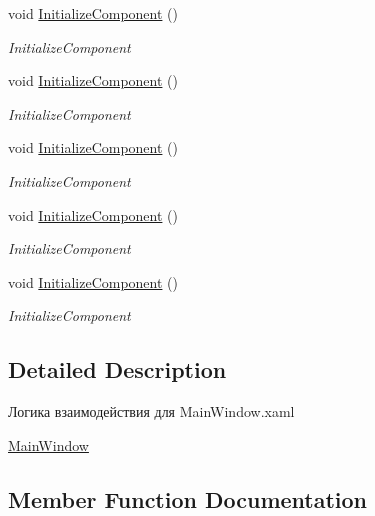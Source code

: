 \begin{DoxyCompactItemize}
void \hyperlink{classtwelve_1_1_main_window_a3b53f5fa36890e3451372782b73b54d1}{Initialize\+Component} ()
\begin{DoxyCompactList}\small\item\em Initialize\+Component \end{DoxyCompactList}\item 
void \hyperlink{classtwelve_1_1_main_window_a3b53f5fa36890e3451372782b73b54d1}{Initialize\+Component} ()
\begin{DoxyCompactList}\small\item\em Initialize\+Component \end{DoxyCompactList}\item 
void \hyperlink{classtwelve_1_1_main_window_a3b53f5fa36890e3451372782b73b54d1}{Initialize\+Component} ()
\begin{DoxyCompactList}\small\item\em Initialize\+Component \end{DoxyCompactList}\item 
void \hyperlink{classtwelve_1_1_main_window_a3b53f5fa36890e3451372782b73b54d1}{Initialize\+Component} ()
\begin{DoxyCompactList}\small\item\em Initialize\+Component \end{DoxyCompactList}\item 
void \hyperlink{classtwelve_1_1_main_window_a3b53f5fa36890e3451372782b73b54d1}{Initialize\+Component} ()
\begin{DoxyCompactList}\small\item\em Initialize\+Component \end{DoxyCompactList}\end{DoxyCompactItemize}


\subsection{Detailed Description}
Логика взаимодействия для Main\+Window.\+xaml 

\hyperlink{classtwelve_1_1_main_window}{Main\+Window} 

\subsection{Member Function Documentation}
\hypertarget{classtwelve_1_1_main_window_a3b53f5fa36890e3451372782b73b54d1}{}
